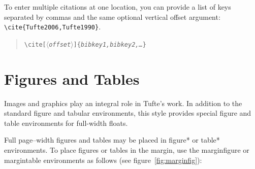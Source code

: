 \documentclass{tufte-handout}
\newcommand{\doccmd}[1]{\texttt{\textbackslash#1}}%
\newcommand{\docopt}[1]{\ensuremath{\langle}\textrm{\textit{#1}}\ensuremath{\rangle}}%
\newcommand{\docarg}[1]{\textrm{\textit{#1}}}%
\newenvironment{docspec}{\begin{quote}\noindent}{\end{quote}}%
\newcommand{\docenv}[1]{\textsf{#1}}%
\begin{document}
To enter multiple citations at one location,\cite{Tufte2006,Tufte1990} you can
provide a list of keys separated by commas and the same optional vertical
offset argument: \Verb|\cite{Tufte2006,Tufte1990}|.  
\begin{docspec}
  \doccmd{cite[\docopt{offset}]\{\docarg{bibkey1,bibkey2,\ldots}\}}
\end{docspec}

\section{Figures and Tables}\label{sec:figures-and-tables}
Images and graphics play an integral role in Tufte's work.
In addition to the standard \docenv{figure} and \docenv{tabular} environments,
this style provides special figure and table environments for full-width
floats.

Full page--width figures and tables may be placed in \docenv{figure*} or
\docenv{table*} environments.  To place figures or tables in the margin,
use the \docenv{marginfigure} or \docenv{margintable} environments as follows
(see figure~\ref{fig:marginfig}):
\end{document}
